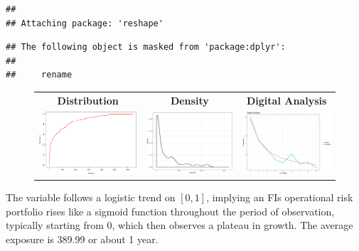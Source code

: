 \documentclass[]{article}
\begin{document}
\begin{verbatim}
## 
## Attaching package: 'reshape'
\end{verbatim}

\begin{verbatim}
## The following object is masked from 'package:dplyr':
## 
##     rename
\end{verbatim}

\begin{figure}
\begin{frame}
      \centering
       \begin{tabular}{ccc}
        \textbf{Distribution} & \textbf{Density} & \textbf{Digital Analysis} \\
        \includegraphics[width=5cm]{Exposure_cdf.eps}
         &
         \includegraphics[width=5cm]{Dist_exposure.eps}
         &
         \includegraphics[width=5cm]{Benford.eps}
         \end{tabular}
    \end{frame}
    \label{Exploration_analysis_exposure}
\end{figure}

The variable follows a logistic trend on \([0,1]\), implying an FIs
operational risk portfolio rises like a sigmoid function throughout the
period of observation, typically starting from \(0\), which then
observes a plateau in growth. The average exposure is 389.99 or about 1
year.\medskip
\end{document}
